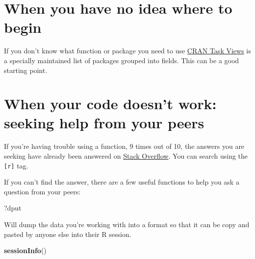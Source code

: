 \documentclass[]{book}
\newenvironment{Shaded}{\begin{snugshade}}{\end{snugshade}}
\newcommand{\KeywordTok}[1]{\textcolor[rgb]{0.13,0.29,0.53}{\textbf{#1}}}
\newcommand{\NormalTok}[1]{#1}
\begin{document}
\section{When you have no idea where to
begin}\label{when-you-have-no-idea-where-to-begin}

If you don't know what function or package you need to use
\href{http://cran.at.r-project.org/web/views}{CRAN Task Views} is a
specially maintained list of packages grouped into fields. This can be a
good starting point.

\section{When your code doesn't work: seeking help from your
peers}\label{when-your-code-doesnt-work-seeking-help-from-your-peers}

If you're having trouble using a function, 9 times out of 10, the
answers you are seeking have already been answered on
\href{http://stackoverflow.com/}{Stack Overflow}. You can search using
the \texttt{{[}r{]}} tag.

If you can't find the answer, there are a few useful functions to help
you ask a question from your peers:

\begin{Shaded}
\begin{Highlighting}[]
\NormalTok{?dput}
\end{Highlighting}
\end{Shaded}

Will dump the data you're working with into a format so that it can be
copy and pasted by anyone else into their R session.

\begin{Shaded}
\begin{Highlighting}[]
\KeywordTok{sessionInfo}\NormalTok{()}
\end{Highlighting}
\end{Shaded}
\end{document}

